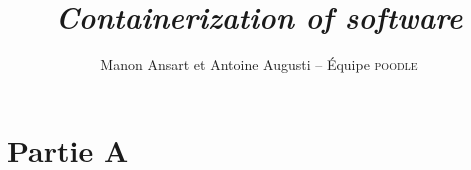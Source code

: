 \documentclass[a4paper, 12pt, french]{article}
\title{\textit{Containerization of software}}
\author{Manon Ansart et Antoine Augusti -- Équipe \textsc{poodle}}
\date{}
\begin{document}
    \maketitle

    \section*{Partie A}
        
\end{document}
